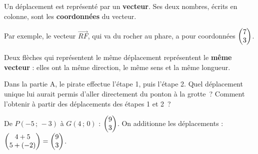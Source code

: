 \documentclass{article}
\newcommand{\rep}[1]{\textcolor{blue!70!black}{#1}}
\newcommand{\dep}[2]{{\renewcommand{\arraystretch}{1}\begin{pmatrix} #1 \\ #2 \end{pmatrix}}}
\begin{document}
\begin{tcolorbox}[colback=blue!4, colframe=blue!55!black, fonttitle=\bfseries, title=Vocabulaire]
  Un déplacement est représenté par un \textbf{vecteur}. Ses deux nombres, écrits en colonne, sont les \textbf{coordonnées} du vecteur.

  Par exemple, le vecteur $\overrightarrow{RF}$, qui va du rocher au phare, a pour coordonnées $\dep{7}{3}$.

  Deux flèches qui représentent le même déplacement représentent le \textbf{même vecteur} : elles ont la même direction, le même sens et la même longueur.
\end{tcolorbox}

\begin{tcolorbox}[colback=orange!5, colframe=orange!70!black, fonttitle=\bfseries, title=Pour aller plus loin]
  Dans la partie A, le pirate effectue l'étape 1, puis l'étape 2. Quel déplacement unique lui aurait permis d'aller directement du ponton à la grotte~? Comment l'obtenir à partir des déplacements des étapes 1 et 2~?

  \rep{De $P(-5\,;\,-3)$ à $G(4\,;\,0)$ : $\dep{9}{3}$. On additionne les déplacements : $\dep{4+5}{5+(-2)} = \dep{9}{3}$.}
\end{tcolorbox}
\end{document}
